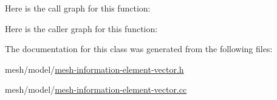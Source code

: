 Here is the call graph for this function\+:




Here is the caller graph for this function\+:




The documentation for this class was generated from the following files\+:\begin{DoxyCompactItemize}
\item 
mesh/model/\hyperlink{mesh-information-element-vector_8h}{mesh-\/information-\/element-\/vector.\+h}\item 
mesh/model/\hyperlink{mesh-information-element-vector_8cc}{mesh-\/information-\/element-\/vector.\+cc}\end{DoxyCompactItemize}
